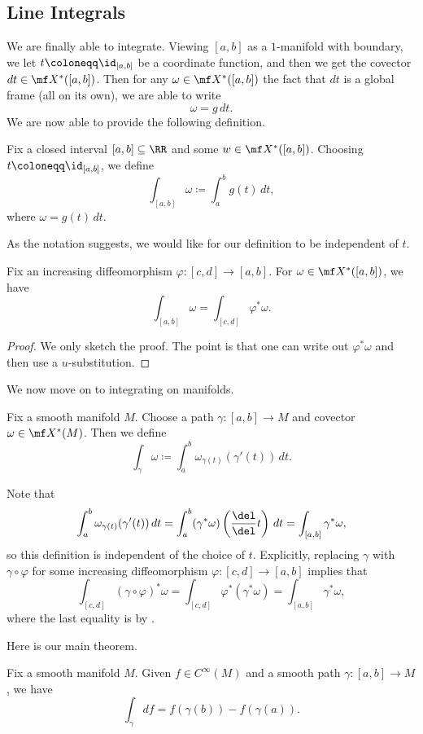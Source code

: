 \documentclass[../notes.tex]{subfiles}
\begin{document}
\subsection{Line Integrals}
We are finally able to integrate. Viewing $[a,b]$ as a $1$-manifold with boundary, we let $t\coloneqq\id_{[a,b]}$ be a coordinate function, and then we get the covector $dt\in\mf X^*([a,b])$. Then for any $\omega\in\mf X^*([a,b])$ the fact that $dt$ is a global frame (all on its own), we are able to write
\[\omega=g\,dt.\]
We are now able to provide the following definition.
\begin{definition}
	Fix a closed interval $[a,b]\subseteq\RR$ and some $w\in\mf X^*([a,b])$. Choosing $t\coloneqq\id_{[a,b]}$, we define
	\[\int_{[a,b]}\omega\coloneqq\int_a^bg(t)\,dt,\]
	where $\omega=g(t)\,dt$.
\end{definition}
As the notation suggests, we would like for our definition to be independent of $t$.
\begin{proposition} \label{prop:reparam-line-int}
	Fix an increasing diffeomorphism $\varphi\colon[c,d]\to[a,b]$. For $\omega\in\mf X^*([a,b])$, we have
	\[\int_{[a,b]}\omega=\int_{[c,d]}\varphi^*\omega.\]
\end{proposition}
\begin{proof}
	We only sketch the proof. The point is that one can write out $\varphi^*\omega$ and then use a $u$-substitution.
\end{proof}
We now move on to integrating on manifolds.
\begin{definition}
	Fix a smooth manifold $M$. Choose a path $\gamma\colon[a,b]\to M$ and covector $\omega\in\mf X^*(M)$. Then we define
	\[\int_\gamma\omega\coloneqq\int_a^b\omega_{\gamma(t)}(\gamma'(t))\,dt.\]
\end{definition}
\begin{remark}
	Note that
	\[\int_a^b\omega_{\gamma(t)}(\gamma'(t))\,dt=\int_a^b(\gamma^*\omega)\left(\frac\del\del t\right)\,dt=\int_{[a,b]}\gamma^*\omega,\]
	so this definition is independent of the choice of $t$. Explicitly, replacing $\gamma$ with $\gamma\circ\varphi$ for some increasing diffeomorphism $\varphi\colon[c,d]\to[a,b]$ implies that
	\[\int_{[c,d]}(\gamma\circ\varphi)^*\omega=\int_{[c,d]}\varphi^*(\gamma^*\omega)=\int_{[a,b]}\gamma^*\omega,\]
	where the last equality is by .
\end{remark}
Here is our main theorem.
\begin{theorem} \label{thm:line-integral}
	Fix a smooth manifold $M$. Given $f\in C^\infty(M)$ and a smooth path $\gamma\colon[a,b]\to M$, we have
	\[\int_\gamma df=f(\gamma(b))-f(\gamma(a)).\]
\end{theorem}
\end{document}
